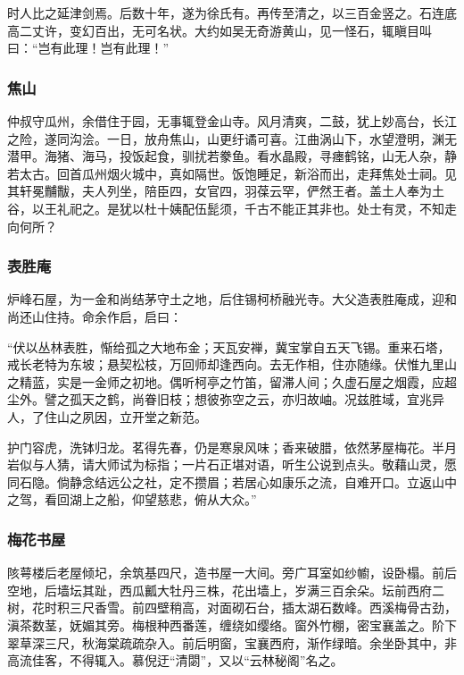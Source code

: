 \documentclass[]{article}
\begin{document}
时人比之延津剑焉。后数十年，遂为徐氏有。再传至清之，以三百金竖之。石连底高二丈许，变幻百出，无可名状。大约如吴无奇游黄山，见一怪石，辄瞋目叫曰：``岂有此理！岂有此理！''

\hypertarget{header-n141}{%
\subsubsection{焦山}\label{header-n141}}

仲叔守瓜州，余借住于园，无事辄登金山寺。风月清爽，二鼓，犹上妙高台，长江之险，遂同沟浍。一日，放舟焦山，山更纡谲可喜。江曲涡山下，水望澄明，渊无潜甲。海猪、海马，投饭起食，驯扰若豢鱼。看水晶殿，寻瘗鹤铭，山无人杂，静若太古。回首瓜州烟火城中，真如隔世。饭饱睡足，新浴而出，走拜焦处士祠。见其轩冕黼黻，夫人列坐，陪臣四，女官四，羽葆云罕，俨然王者。盖土人奉为土谷，以王礼祀之。是犹以杜十姨配伍髭须，千古不能正其非也。处士有灵，不知走向何所？

\hypertarget{header-n146}{%
\subsubsection{表胜庵}\label{header-n146}}

炉峰石屋，为一金和尚结茅守土之地，后住锡柯桥融光寺。大父造表胜庵成，迎和尚还山住持。命余作启，启曰：

``伏以丛林表胜，惭给孤之大地布金；天瓦安禅，冀宝掌自五天飞锡。重来石塔，戒长老特为东坡；悬契松枝，万回师却逢西向。去无作相，住亦随缘。伏惟九里山之精蓝，实是一金师之初地。偶听柯亭之竹笛，留滞人间；久虚石屋之烟霞，应超尘外。譬之孤天之鹤，尚眷旧枝；想彼弥空之云，亦归故岫。况兹胜域，宜兆异人，了住山之夙因，立开堂之新范。

护门容虎，洗钵归龙。茗得先春，仍是寒泉风味；香来破腊，依然茅屋梅花。半月岩似与人猜，请大师试为标指；一片石正堪对语，听生公说到点头。敬藉山灵，愿同石隐。倘静念结远公之社，定不攒眉；若居心如康乐之流，自难开口。立返山中之驾，看回湖上之船，仰望慈悲，俯从大众。''

\hypertarget{header-n153}{%
\subsubsection{梅花书屋}\label{header-n153}}

陔萼楼后老屋倾圮，余筑基四尺，造书屋一大间。旁广耳室如纱幮，设卧榻。前后空地，后墙坛其趾，西瓜瓤大牡丹三株，花出墙上，岁满三百余朵。坛前西府二树，花时积三尺香雪。前四壁稍高，对面砌石台，插太湖石数峰。西溪梅骨古劲，滇茶数茎，妩媚其旁。梅根种西番莲，缠绕如缨络。窗外竹棚，密宝襄盖之。阶下翠草深三尺，秋海棠疏疏杂入。前后明窗，宝襄西府，渐作绿暗。余坐卧其中，非高流佳客，不得辄入。慕倪迂``清閟''，又以``云林秘阁''名之。
\end{document}

